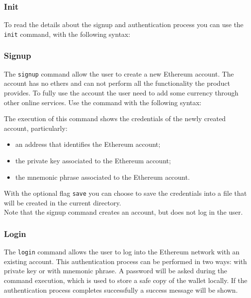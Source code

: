 \subsubsection{Init}
To read the details about the signup and authentication process you can use the \texttt{init} command, with the following syntax:
\begin{center}
\end{center}

\subsubsection{Signup}
The \texttt{signup} command allow the user to create a new Ethereum account. The account has no ethers and can not perform all the functionality the product provides.
To fully use the account the user need to add some currency through other online services.
Use the command with the following syntax:

\begin{center}
\end{center}

\noindent The execution of this command shows the credentials of the newly created account, particularly:
\begin{itemize}
	\item an address that identifies the Ethereum account;
	\item the private key associated to the Ethereum account;
	\item the mnemonic phrase associated to the Ethereum account.
\end{itemize}
With the optional flag \texttt{save} you can choose to save the credentials into a file that will be created in the current directory. \\
Note that the signup command creates an account, but does not log in the user.

\subsubsection{Login}
The \texttt{login} command allows the user to log into the Ethereum network with an existing account.
This authentication process can be performed in two ways: with private key or with mnemonic phrase.
A password will be asked during the command execution, which is used to store a safe copy of the wallet locally. If the authentication process completes successfully a success message will be shown.

